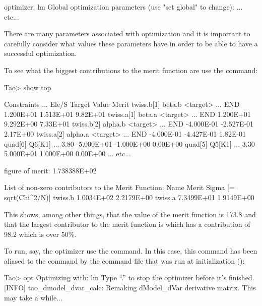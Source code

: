 \documentclass{hitec}     %
\begin{document}
{\begin{code}
optimizer:        lm
Global optimization parameters (use "set global" to change):
... etc...
\end{code}
There are many parameters associated with optimization and it is important to carefully consider
what values these parameters have in order to be able to have a successful optimization.

To see what the biggest contributions to the merit function
are use the  command:
\begin{code}
Tao> show top

Constraints                   ...   Ele/S     Target      Value      Merit  
twiss.b[1]  beta.b <target>   ...   END       1.200E+01   1.513E+01  9.82E+01
twiss.a[1]  beta.a <target>   ...   END       1.200E+01   9.292E+00  7.33E+01
twiss.b[2]  alpha.b <target>  ...   END      -4.000E-01  -2.527E-01  2.17E+00
twiss.a[2]  alpha.a <target>  ...   END      -4.000E-01  -4.427E-01  1.82E-01
quad[6]     Q6[K1]            ...   3.80     -5.000E+01  -1.000E+00  0.00E+00
quad[5]     Q5[K1]            ...   3.30      5.000E+01   1.000E+00  0.00E+00
... etc...

 figure of merit: 1.738388E+02

List of non-zero contributors to the Merit Function:
Name                           Merit           Sigma [= sqrt(Chi^2/N)]
twiss.b                        1.0034E+02      2.2179E+00
twiss.a                        7.3499E+01      1.9149E+00
\end{code}
This shows, among other things, that the value of the merit function is 173.8 and that the largest
contributor to the merit function is  which has a contribution of 98.2 which is over
50\%.

To run, say, the  optimizer use the  command. In this case, this command
has been aliased to the  command by the  command file that was run
at initialization ():
\begin{code}
Tao> opt
Optimizing with: lm
Type ``.'' to stop the optimizer before it's finished.
[INFO] tao_dmodel_dvar_calc:
    Remaking dModel_dVar derivative matrix.
    This may take a while...


\end{code}}
\end{document}
